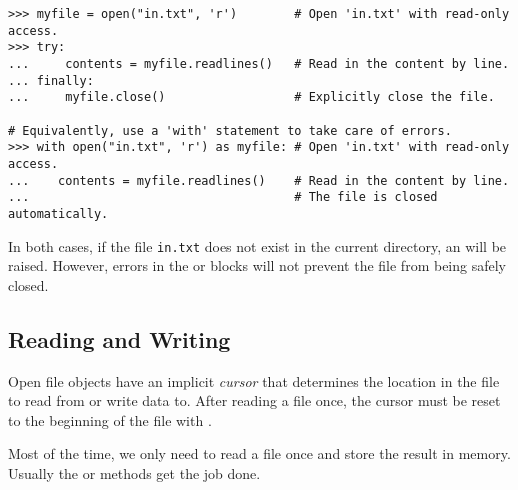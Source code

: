 \begin{lstlisting}
>>> myfile = open("in.txt", 'r')        # Open 'in.txt' with read-only access.
>>> try:    
...     contents = myfile.readlines()   # Read in the content by line.
... finally:
...     myfile.close()                  # Explicitly close the file.

# Equivalently, use a 'with' statement to take care of errors.
>>> with open("in.txt", 'r') as myfile: # Open 'in.txt' with read-only access.
...    contents = myfile.readlines()    # Read in the content by line.
...                                     # The file is closed automatically.
\end{lstlisting}

In both cases, if the file \texttt{in.txt} does not exist in the current directory, an  will be raised.
However, errors in the  or  blocks will not prevent the file from being safely closed.

\subsection*{Reading and Writing} %

Open file objects have an implicit \emph{cursor} that determines the location in the file to read from or write data to.
After reading a file once, the cursor must be reset to the beginning of the file with .

Most of the time, we only need to read a file once and store the result in memory.
Usually the  or  methods get the job done.

